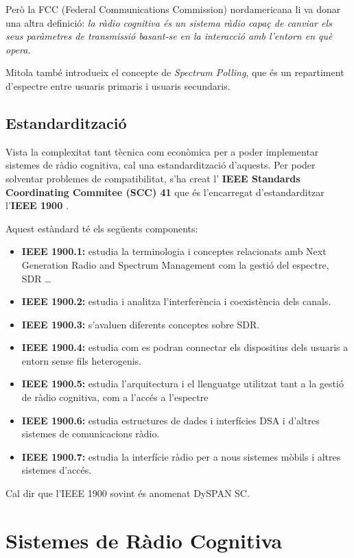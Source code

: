 \documentclass[10pt,journal,a4paper]{IEEEtran}
\begin{document}
Però la FCC (Federal Communications Commission) nordamericana li va donar una altra definició: \emph{la ràdio cognitiva és un sistema ràdio capaç de canviar els seus paràmetres de transmissió basant-se en la interacció amb l'entorn en què opera.}

Mitola també introdueix el concepte de \emph{Spectrum Polling}, que és un repartiment d'espectre entre usuaris primaris i usuaris secundaris.

\subsection{Estandardització}
Vista la complexitat tant tècnica com econòmica per a poder implementar sistemes de ràdio cognitiva, cal una estandardització d'aquests.
Per poder solventar problemes de compatibilitat, s'ha creat  l' \textbf{IEEE Standards Coordinating Commitee (SCC) 41} que és l'encarregat d'estandarditzar l'\textbf{IEEE 1900} \cite{ieee_1900}.

Aquest estàndard té els següents components: 

\begin{itemize}
\item \textbf{IEEE 1900.1:} estudia la terminologia  i conceptes relacionats amb Next Generation Radio and Spectrum Management com la gestió del espectre, SDR \ldots
\item \textbf{IEEE 1900.2:} estudia i analitza l'interferència i coexistència dels canals.
\item \textbf{IEEE 1900.3:} s'avaluen diferents conceptes  sobre SDR.
\item \textbf{IEEE 1900.4:} estudia com es podran connectar els dispositius dels usuaris a entorn sense fils heterogenis.
\item \textbf{IEEE 1900.5:} estudia l'arquitectura i el llenguatge utilitzat  tant a la gestió de ràdio cognitiva, com a l'accés a l'espectre 
\item \textbf{IEEE 1900.6:} estudia estructures de dades i interfícies DSA i d'altres sistemes de comunicacions ràdio.
\item \textbf{IEEE 1900.7:} estudia la interfície ràdio per a nous sistemes mòbils i altres sistemes d'accés.
\end{itemize}
Cal dir que l'IEEE 1900 sovint és anomenat DySPAN SC.
\section{Sistemes de Ràdio Cognitiva}
\end{document}
